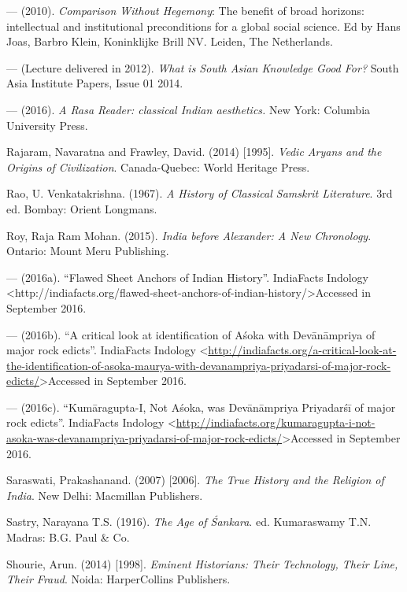 \begin{thebibliography}{99}
  — (2010). \textit{Comparison Without Hegemony}: The benefit of broad horizons: intellectual and institutional preconditions for a global social science. Ed by Hans Joas, Barbro Klein, Koninklijke Brill NV. Leiden, The Netherlands.

  — (Lecture delivered in 2012). \textit{What is South Asian Knowledge Good For?} South Asia Institute Papers, Issue 01 2014.

  — (2016). \textit{A Rasa Reader: classical Indian aesthetics.} New York: Columbia University Press.

  Rajaram, Navaratna and Frawley, David. (2014) [1995]. \textit{Vedic Aryans and the Origins of Civilization}. Canada-Quebec: World Heritage Press.

  Rao, U. Venkatakrishna. (1967). \textit{A History of Classical Samskrit Literature}. 3rd ed. Bombay: Orient Longmans.

  Roy, Raja Ram Mohan. (2015). \textit{India before Alexander: A New Chronology}. Ontario: Mount Meru Publishing.

  — (2016a). “Flawed Sheet Anchors of Indian History”. IndiaFacts Indology \textless http://indiafacts.org/flawed-sheet-anchors-of-indian-\break history/\textgreater  Accessed in September 2016.

  — (2016b). “A critical look at identification of Aśoka with Devānāmpriya of major rock edicts”. IndiaFacts Indology \textless \url{http://indiafacts.org/a-critical-look-at-the-identification-of-asoka-maurya-with-devanampriya-priyadarsi-of-major-rock-edicts/}\textgreater  Accessed in September 2016.

  — (2016c). “Kumāragupta-I, Not Aśoka, was Devānāmpriya Priyadarśī of major rock edicts”. IndiaFacts Indology \textless \url{http://indiafacts.org/kumaragupta-i-not-asoka-was-devanampriya-priyadarsi-of-major-rock-edicts/}\textgreater  Accessed in September 2016.

  Saraswati, Prakashanand. (2007) [2006]. \textit{The True History and the Religion of India}. New Delhi: Macmillan Publishers.

  Sastry, Narayana T.S. (1916). \textit{The Age of Śankara}. ed. Kumaraswamy T.N. Madras: B.G. Paul \& Co.

  Shourie, Arun. (2014) [1998]. \textit{Eminent Historians: Their Technology, Their Line, Their Fraud}. Noida: HarperCollins Publishers.


\end{thebibliography}
